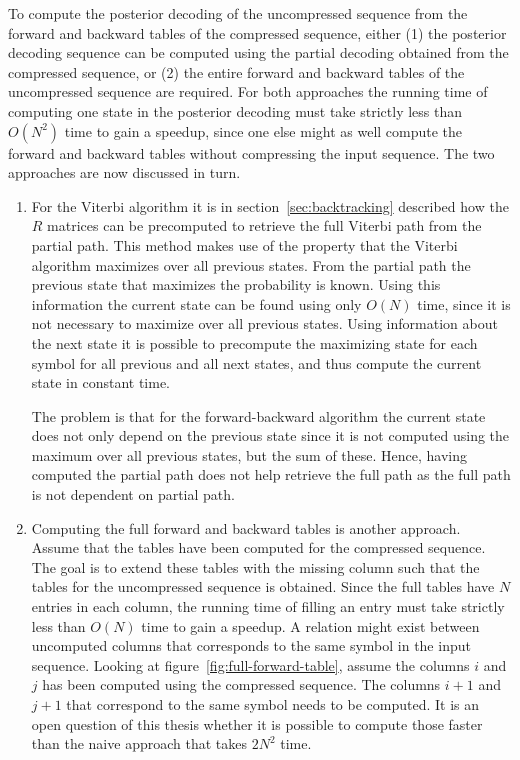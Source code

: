 To compute the posterior decoding of the uncompressed sequence from the
forward and backward tables of the compressed sequence, either (1) the
posterior decoding sequence can be computed using the partial decoding obtained
from the compressed sequence, or (2) the entire forward and backward tables of
the uncompressed sequence are required. For both approaches the running time of
computing one state in the posterior decoding must take strictly less than
$O(N^2)$ time to gain a speedup, since one else might as well compute the
forward and backward tables without compressing the input sequence. The two
approaches are now discussed in turn.

\begin{enumerate}
\item For the Viterbi algorithm it is in section~\ref{sec:backtracking}
  described how the $R$ matrices can be precomputed to retrieve the full
  Viterbi path from the partial path. This method makes use of the property
  that the Viterbi algorithm maximizes over all previous states. From the
  partial path the previous state that maximizes the probability is known. Using
  this information the current state can be found using only $O(N)$ time, since
  it is not necessary to maximize over all previous states. Using information
  about the next state it is possible to precompute the maximizing state for
  each symbol for all previous and all next states, and thus compute the
  current state in constant time.

  The problem is that for the forward-backward algorithm the current state does
  not only depend on the previous state since it is not computed using the
  maximum over all previous states, but the sum of these. Hence, having computed
  the partial path does not help retrieve the full path as the full path is
  not dependent on partial path.
\item Computing the full forward and backward tables is another approach.
  Assume that the tables have been computed for the compressed sequence. The
  goal is to extend these tables with the missing column such that the tables
  for the uncompressed sequence is obtained. Since the full tables have $N$
  entries in each column, the running time of filling an entry must take
  strictly less than $O(N)$ time to gain a speedup. A relation might exist
  between uncomputed columns that corresponds to the same symbol in the input
  sequence. Looking at figure~\ref{fig:full-forward-table}, assume the columns
  $i$ and $j$ has been computed using the compressed sequence. The columns
  $i + 1$ and $j + 1$ that correspond to the same symbol needs to be computed.
  It is an open question of this thesis whether it is possible to compute those
  faster than the naive approach that takes $2N^2$ time.
\end{enumerate}

